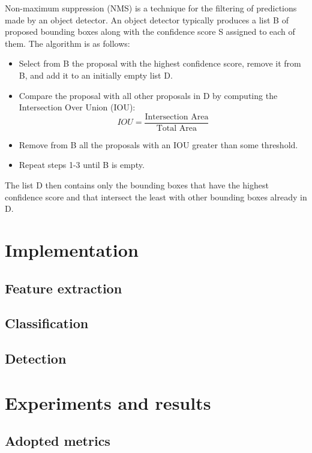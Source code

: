 \documentclass[journal,twocolumn]{IEEEtran}
\begin{document}
Non-maximum suppression (NMS) is a technique for the
filtering of predictions made by an object detector. An object
detector typically produces a list B of proposed bounding
boxes along with the confidence score S assigned to each of
them. The algorithm is as follows:
\begin{itemize}
\item Select from B the proposal with the highest confidence
score, remove it from B, and add it to an initially empty
list D.
\item Compare the proposal with all other proposals in D by
computing the Intersection Over Union (IOU):
\begin{equation*}
IOU=\frac{\text{Intersection Area}}{\text{Total Area}}
\end{equation*}
\item Remove from B all the proposals with an IOU greater
than some threshold.
\item Repeat steps 1-3 until B is empty.
\end{itemize}

The list D then contains only the bounding boxes that have the highest confidence score and that intersect the least with other bounding boxes already in D.

\section{Implementation}
\label{sec:imp}

\subsection{Feature extraction}

\subsection{Classification}

\subsection{Detection}

\section{Experiments and results}
\label{sec:exp}

\subsection{Adopted metrics}
\end{document}
